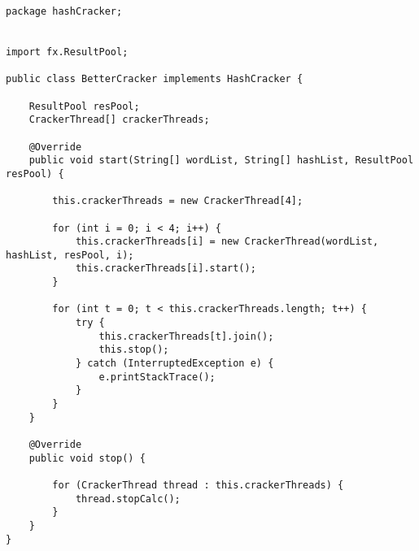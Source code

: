 \begin{enumerate}
\begin{lstlisting}[style=java]
\end{lstlisting}

\begin{lstlisting}[style=java]
package hashCracker;


import fx.ResultPool;

public class BetterCracker implements HashCracker {

    ResultPool resPool;
    CrackerThread[] crackerThreads;

    @Override
    public void start(String[] wordList, String[] hashList, ResultPool resPool) {

        this.crackerThreads = new CrackerThread[4];

        for (int i = 0; i < 4; i++) {
            this.crackerThreads[i] = new CrackerThread(wordList, hashList, resPool, i);
            this.crackerThreads[i].start();
        }

        for (int t = 0; t < this.crackerThreads.length; t++) {
            try {
                this.crackerThreads[t].join();
                this.stop();
            } catch (InterruptedException e) {
                e.printStackTrace();
            }
        }
    }

    @Override
    public void stop() {

        for (CrackerThread thread : this.crackerThreads) {
            thread.stopCalc();
        }
    }
}

\end{lstlisting}

\end{enumerate}

